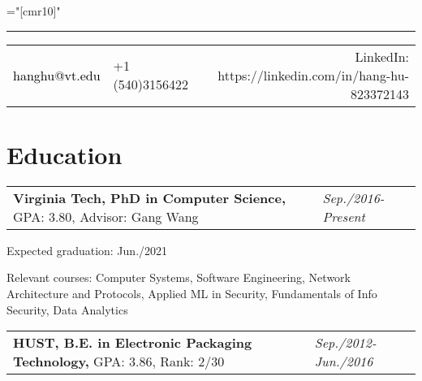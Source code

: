 \documentclass[a4paper,10pt]{article}
\newenvironment{packed_itemize}{
\begin{list}{\labelitemi}{\leftmargin=2em}
\setlength{\itemsep}{0pt}
\setlength{\parskip}{0pt}
\setlength{\parsep}{0pt}
\setlength{\headsep}{0pt}
\setlength{\topskip}{0pt}
\setlength{\topmargin}{0pt}
\setlength{\topsep}{0pt}
\setlength{\partopsep}{0pt}
}{\end{list}}
\begin{document}
\pagestyle{empty} %

\font\fb="[cmr10]" %

\bigskip

\hrule height 0.7mm \vspace{-0.4em}
\begin{tabular}{lp{2cm}r}
{\small \textcolor{black}{hanghu@vt.edu}}
&{\small +1 (540)3156422}
&{\small LinkedIn: https://linkedin.com/in/hang-hu-823372143}\\
\end{tabular}
\section{Education}

\vspace{-0.2cm}

\begin{tabular}{p{15cm}p{3cm}}
\textbf{Virginia Tech, PhD in Computer Science,} GPA: 3.80, Advisor: Gang Wang & \emph{Sep./2016-Present} \\
\end{tabular}
\begin{packed_itemize}
\item Expected graduation: Jun./2021 \\
\item Relevant courses: Computer Systems, Software Engineering, Network Architecture and Protocols, Applied ML in Security, Fundamentals of Info Security, Data Analytics \\
\end{packed_itemize}

\begin{tabular}{p{15cm}p{3cm}}
\textbf{HUST, B.E. in Electronic Packaging Technology,} GPA: 3.86, Rank: 2/30 & \emph{Sep./2012-Jun./2016} \\
\end{tabular}
\vspace{-1em}
\end{document}
